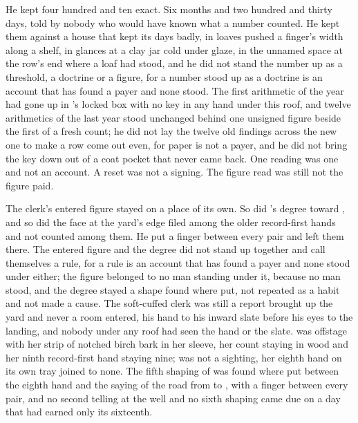He kept four hundred and ten exact. Six months and two hundred and thirty days, told by nobody who would have known what a number counted. He kept them against a house that kept its days badly, in loaves pushed a finger's width along a shelf, in glances at a clay jar cold under glaze, in the unnamed space at the row's end where a loaf had stood, and he did not stand the number up as a threshold, a doctrine or a figure, for a number stood up as a doctrine is an account that has found a payer and none stood. The first arithmetic of the year had gone up  in 's locked box with no key in any hand under this roof, and twelve arithmetics of the last year stood unchanged behind one unsigned figure beside the first of a fresh count; he did not lay the twelve old findings across the new one to make a row come out even, for paper is not a payer, and he did not bring the key down out of a coat pocket that never came back. One reading was one and not an account. A reset was not a signing. The figure read was still not the figure paid.

The clerk's entered figure stayed on a place of its own. So did 's degree toward , and so did the face at the yard's edge filed among the older record-first hands and not counted among them. He put a finger between every pair and left them there. The entered figure and the degree did not stand up together and call themselves a rule, for a rule is an account that has found a payer and none stood under either; the figure belonged to no man standing under it, because no man stood, and the degree stayed a shape found where put, not repeated as a habit and not made a cause. The soft-cuffed clerk was still a report brought up the yard and never a room entered, his hand to his inward slate before his eyes to the landing, and nobody under any roof had seen the hand or the slate. \person[Ilva] was offstage with her strip of notched birch bark in her sleeve, her count staying in wood and her ninth record-first hand staying nine;  was not a sighting, her eighth hand on its own tray joined to none. The fifth shaping of  was found where put between the eighth hand and the saying of the road from  to , with a finger between every pair, and no second telling at the well and no sixth shaping came due on a day that had earned only its sixteenth.

